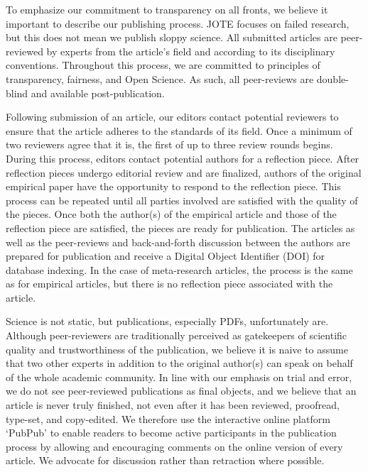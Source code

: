 \documentclass[twocolumn, serif]{jote-article}
\begin{document}
{{{{{{{{{{\hypertarget{jotes-editorial-pipeline}{%

To emphasize our commitment to transparency on all fronts, we believe it important to describe our publishing process. JOTE focuses on failed research, but this does not mean we publish sloppy science. All submitted articles are peer-reviewed by experts from the article's field and according to its disciplinary conventions. Throughout this process, we are committed to principles of transparency, fairness, and Open Science. As such, all peer-reviews are double-blind and available post-publication.

Following submission of an article, our editors contact potential reviewers to ensure that the article adheres to the standards of its field. Once a minimum of two reviewers agree that it is, the first of up to three review rounds begins. During this process, editors contact potential authors for a reflection piece. After reflection pieces undergo editorial review and are finalized, authors of the original empirical paper have the opportunity to respond to the reflection piece.
This process can be repeated until all parties involved are satisfied with the quality of the pieces. Once both the author(s) of the empirical article and those of the reflection piece are satisfied, the pieces are ready for publication. The articles as well as the peer-reviews and back-and-forth discussion between the authors are prepared for publication and receive a Digital Object Identifier (DOI) for database indexing. In the case of meta-research articles, the process is the same as for empirical articles, but there is no reflection piece associated with the article.

Science is not static, but publications, especially PDFs, unfortunately are. Although peer-reviewers are traditionally perceived as gatekeepers of scientific quality and trustworthiness of the publication, we believe it is naive to assume that two other experts in addition to the original author(s) can speak on behalf of the whole academic community. In line with our emphasis on trial and error, we do not see peer-reviewed publications as final objects, and we believe that an article is never truly finished, not even after it has been reviewed, proofread, type-set, and copy-edited. We therefore use the interactive online platform `PubPub' to enable readers to become active participants in the publication process by allowing and encouraging comments on the online version of every article. We advocate for discussion rather than retraction where possible.

}}}}}}}}}}}
\end{document}
